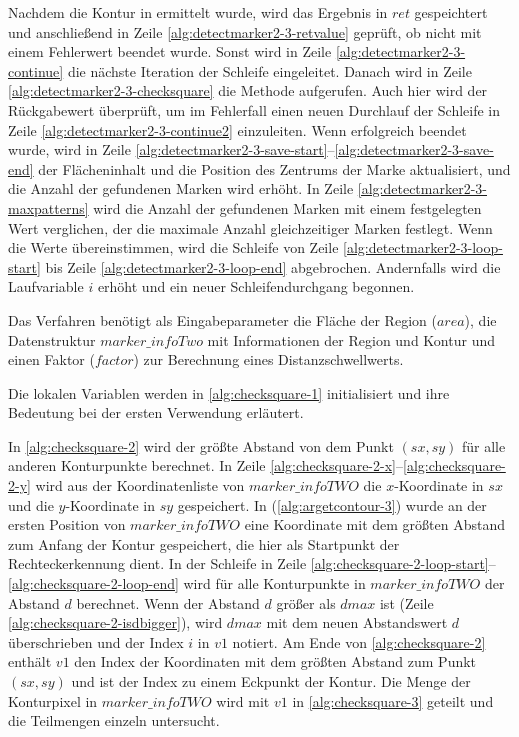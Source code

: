 Nachdem die Kontur in  ermittelt wurde, wird das Ergebnis in $\mathit{ret}$ gespeichtert und
 anschließend in Zeile \ref{alg:detectmarker2-3-retvalue} geprüft, ob  nicht mit einem
 Fehlerwert beendet wurde. Sonst wird in Zeile \ref{alg:detectmarker2-3-continue} die nächste Iteration der Schleife
 eingeleitet. Danach wird in Zeile \ref{alg:detectmarker2-3-checksquare} die Methode  aufgerufen.
 Auch hier wird der Rückgabewert überprüft, um im Fehlerfall einen neuen Durchlauf der Schleife in Zeile
 \ref{alg:detectmarker2-3-continue2} einzuleiten. Wenn  erfolgreich beendet wurde, wird in Zeile
 \ref{alg:detectmarker2-3-save-start}--\ref{alg:detectmarker2-3-save-end} der Flächeninhalt und die Position des
 Zentrums der Marke aktualisiert, und die Anzahl der gefundenen Marken wird erhöht. In Zeile
 \ref{alg:detectmarker2-3-maxpatterns} wird die Anzahl der gefundenen Marken mit einem festgelegten Wert verglichen, der
 die maximale Anzahl gleichzeitiger Marken festlegt. Wenn die Werte übereinstimmen, wird die Schleife von Zeile
 \ref{alg:detectmarker2-3-loop-start} bis Zeile \ref{alg:detectmarker2-3-loop-end} abgebrochen. Andernfalls wird die
 Laufvariable $i$ erhöht und ein neuer Schleifendurchgang begonnen.

Das Verfahren  benötigt als Eingabeparameter die Fläche der Region ($\mathit{area}$), die
 Datenstruktur $\mathit{marker\_infoTwo}$ mit Informationen der Region und Kontur und einen Faktor ($\mathit{factor}$)
 zur Berechnung eines Distanzschwellwerts.



Die lokalen Variablen werden in \autoref{alg:checksquare-1} initialisiert und ihre Bedeutung bei der ersten Verwendung erläutert.



In \autoref{alg:checksquare-2} wird der größte Abstand von dem Punkt $(\mathit{sx},\mathit{sy})$ für alle anderen
 Konturpunkte berechnet. In Zeile \ref{alg:checksquare-2-x}--\ref{alg:checksquare-2-y} wird aus der Koordinatenliste
 von $\mathit{marker\_infoTWO}$ die $x$-Koordinate in $\mathit{sx}$ und die $y$-Koordinate in $\mathit{sy}$
 gespeichert. In  (\autoref{alg:argetcontour-3}) wurde an der ersten Position von
 $\mathit{marker\_infoTWO}$ eine Koordinate mit dem größten Abstand zum Anfang der Kontur gespeichert, die hier als
 Startpunkt der Rechteckerkennung dient. In der Schleife in Zeile
 \ref{alg:checksquare-2-loop-start}--\ref{alg:checksquare-2-loop-end} wird für alle Konturpunkte in
 $\mathit{marker\_infoTWO}$ der Abstand $d$ berechnet. Wenn der Abstand $d$ größer als $\mathit{dmax}$ ist (Zeile
 \ref{alg:checksquare-2-isdbigger}), wird $\mathit{dmax}$ mit dem neuen Abstandswert $d$ überschrieben und der Index
 $i$ in $\mathit{v1}$ notiert. Am Ende von \autoref{alg:checksquare-2} enthält $\mathit{v1}$ den Index der Koordinaten
 mit dem größten Abstand zum Punkt $(\mathit{sx},\mathit{sy})$ und ist der Index zu einem Eckpunkt der Kontur. Die
 Menge der Konturpixel in $\mathit{marker\_infoTWO}$ wird mit $\mathit{v1}$ in \autoref{alg:checksquare-3} geteilt und
 die Teilmengen einzeln untersucht.

